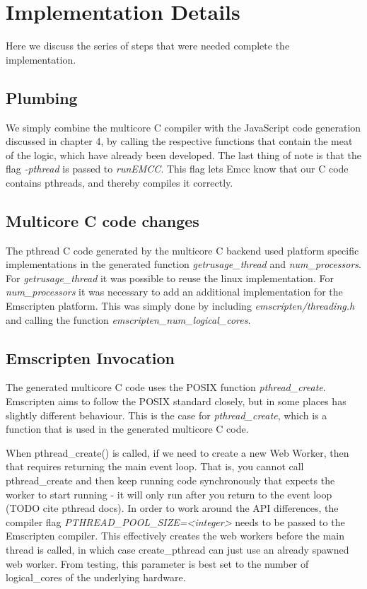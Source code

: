 \documentclass[11pt]{book}
\begin{document}
\section{Implementation Details}
Here we discuss the series of steps that were needed complete the implementation.
\subsection{Plumbing}

We simply combine the multicore C compiler with the JavaScript code generation discussed in chapter 4, by calling the respective functions that contain the meat of the logic, which have already been developed. The last thing of note is that the flag \textit{-pthread} is passed to \textit{runEMCC}. This flag lets Emcc know that our C code contains pthreads, and thereby compiles it correctly.


\subsection{Multicore C code changes}
The pthread C code generated by the multicore C backend used platform specific implementations in the generated function \textit{getrusage\_thread} and \textit{num\_processors}. For \textit{getrusage\_thread} it was possible to reuse the linux implementation. For \textit{num\_processors} it was necessary to add an additional implementation for the Emscripten platform. This was simply done by including \textit{emscripten/threading.h} and calling the function \textit{emscripten\_num\_logical\_cores}.




\subsection{Emscripten Invocation}

The generated multicore C code uses the POSIX function \textit{pthread\_create}. Emscripten aims to follow the POSIX standard closely, but in some places has slightly different behaviour. This is the case for \textit{pthread\_create}, which is a function that is used in the generated multicore C code. 

When pthread\_create() is called, if we need to create a new Web Worker, then that requires returning the main event loop. That is, you cannot call pthread\_create and then keep running code synchronously that expects the worker to start running - it will only run after you return to the event loop (TODO cite pthread docs). In order to work around the API differences, the compiler flag \textit{PTHREAD\_POOL\_SIZE=<integer>} needs to be passed to the Emscripten compiler. This effectively creates the web workers before the main thread is called, in which case create\_pthread can just use an already spawned web worker. From testing, this parameter is best set to the number of logical\_cores of the underlying hardware.
\end{document}
